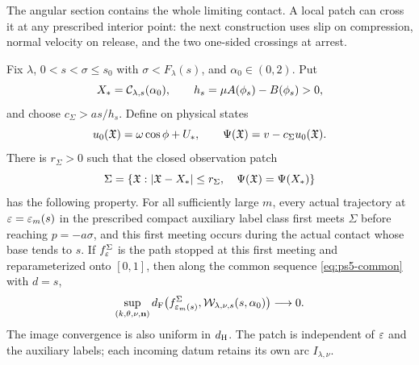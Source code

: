 The angular section contains the whole limiting contact. A local patch
can cross it at any prescribed interior point: the next construction
uses slip on compression, normal velocity on release, and the two
one-sided crossings at arrest.

\begin{corollary}
\label{cor:common-local-contact}
Fix $\lambda$, $0<s<\sigma\le s_0$ with
$\sigma<F_\lambda(s)$, and $\alpha_0\in(0,2)$. Put
\[
 X_*=\mathcal C_{\lambda,s}(\alpha_0),\qquad
 h_s=\mu A(\phi_s)-B(\phi_s)>0,
\]
and choose $c_\Sigma>as/h_s$. Define on physical states
\[
 u_0(\mathfrak X)=\omega\cos\phi+U_*,\qquad
 \Psi(\mathfrak X)=v-c_\Sigma u_0(\mathfrak X).
\]
There is $r_\Sigma>0$ such that the closed observation patch
\[
 \Sigma=\{\mathfrak X:|\mathfrak X-X_*|\le r_\Sigma,\quad
                         \Psi(\mathfrak X)=\Psi(X_*)\}
\]
has the following property. For all sufficiently large $m$, every
actual trajectory at $\varepsilon=\varepsilon_m(s)$ in the prescribed compact auxiliary label class
first meets $\Sigma$ before reaching $p=-a\sigma$, and this first
meeting occurs during the actual contact whose base tends to $s$.
If $f_\varepsilon^\Sigma$ is the path stopped at this first meeting and
reparameterized onto $[0,1]$, then
along the common sequence \eqref{eq:ps5-common} with $d=s$,
\[
 \sup_{(k,\theta,\nu,\mathbf n)}
 d_{\mathrm F}\bigl(f_{\varepsilon_m(s)}^\Sigma,
             \mathcal W_{\lambda,\nu,s}(s,\alpha_0)\bigr)
       \longrightarrow0.
\]
The image convergence is also uniform in $d_{\mathrm H}$. The patch is
independent of $\varepsilon$ and the auxiliary labels; each incoming datum
retains its own arc $I_{\lambda,\nu}$.
\end{corollary}

